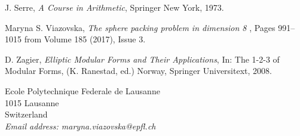 \begin{thebibliography}{20}
 {\sc J. Serre}, {\em A Course in Arithmetic}, Springer New York, 1973.




 {\sc Maryna S. Viazovska}, {\em The sphere packing problem in dimension 8	},
Pages 991--1015 from Volume 185 (2017), Issue 3.

 {\sc D. Zagier}, {\em Elliptic Modular Forms and Their Applications}, In:  The 1-2-3 of Modular Forms, (K. Ranestad, ed.) Norway, Springer Universitext, 2008.
\end{thebibliography}

\newpage

{\footnotesize
\noindent
Ecole Polytechnique Federale de Lausanne\\
1015 Lausanne\\
Switzerland\\
{\it Email address: maryna.viazovska@epfl.ch}}
